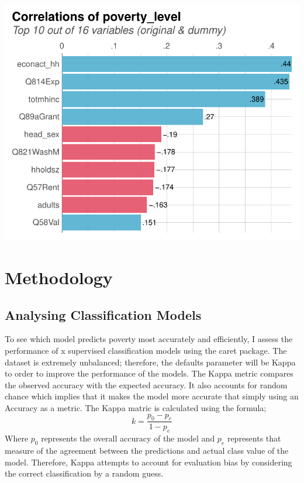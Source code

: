 \documentclass[11pt,preprint, authoryear]{elsarticle}
\let\origfigure\figure
\let\endorigfigure\endfigure
\renewenvironment{figure}[1][2] {
    \expandafter\origfigure\expandafter[H]
} {
    \endorigfigure
}
\numberwithin{equation}{section}
\numberwithin{figure}{section}
\numberwithin{table}{section}
\begin{document}
\begin{figure}[H]

{\centering \includegraphics{Predicting-Poverty_files/figure-latex/Figure4-1} 

}

\caption{Correlation with dependent variable \label{Figure4}}\label{fig:Figure4}
\end{figure}

\hypertarget{methodology}{%
\section{\texorpdfstring{Methodology
\label{Meth}}{Methodology }}\label{methodology}}

\hypertarget{analysing-classification-models}{%
\subsection{Analysing Classification
Models}\label{analysing-classification-models}}

To see which model predicts poverty most accurately and efficiently, I
assess the performance of x supervised classification models using the
caret package. The dataset is extremely unbalanced; therefore, the
defaults parameter will be Kappa to order to improve the performance of
the models. The Kappa metric compares the observed accuracy with the
expected accuracy. It also accounts for random chance which implies that
it makes the model more accurate that simply using an Accuracy as a
metric. The Kappa matric is calculated using the formula;
\[k = \frac{p_0 -p_e}{1-p_e}\] Where \(p_0\) represents the overall
accuracy of the model and \(p_e\) represents that measure of the
agreement between the predictions and actual class value of the model.
Therefore, Kappa attempts to account for evaluation bias by considering
the correct classification by a random guess.
\end{document}
